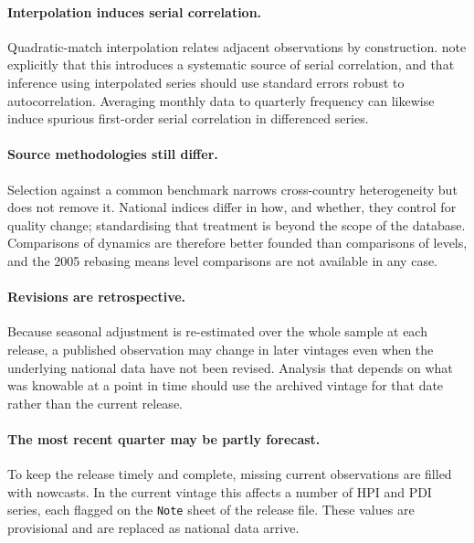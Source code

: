 \paragraph{Interpolation induces serial correlation.}
Quadratic-match interpolation relates adjacent observations by construction.
\citet{mack2011} note explicitly that this introduces a systematic source of
serial correlation, and that inference using interpolated series should use
standard errors robust to autocorrelation. Averaging monthly data to
quarterly frequency can likewise induce spurious first-order serial
correlation in differenced series.

\paragraph{Source methodologies still differ.}
Selection against a common benchmark narrows cross-country heterogeneity but
does not remove it. National indices differ in how, and whether, they control
for quality change; standardising that treatment is beyond the scope of the
database. Comparisons of dynamics are therefore better founded than
comparisons of levels, and the 2005 rebasing means level comparisons are not
available in any case.

\paragraph{Revisions are retrospective.}
Because seasonal adjustment is re-estimated over the whole sample at each
release, a published observation may change in later vintages even when the
underlying national data have not been revised. Analysis that depends on what
was knowable at a point in time should use the archived vintage for that
date rather than the current release.

\paragraph{The most recent quarter may be partly forecast.}
To keep the release timely and complete, missing current observations are
filled with nowcasts. In the current vintage this affects a number of HPI and
PDI series, each flagged on the \texttt{Note} sheet of the release file.
These values are provisional and are replaced as national data arrive.
